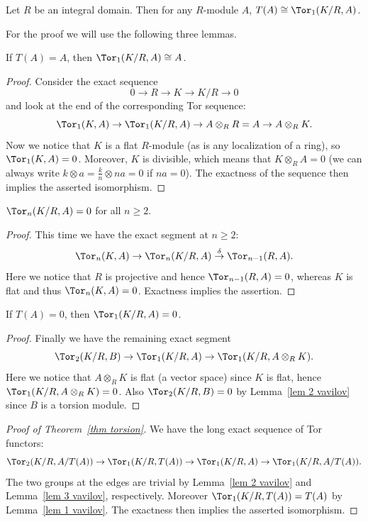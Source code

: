 \begin{thm}\label{thm torsion}
    Let $R$ be an integral domain. Then for any $R$-module $A$, $T(A)\cong \Tor_1(K\slash R,A)$.
\end{thm}
For the proof we will use the following three lemmas.
\begin{lem}\label{lem 1 vavilov}
    If $T(A)=A$, then $\Tor_1(K\slash R,A)\cong A$.
\end{lem}
\begin{proof}
    Consider the exact sequence
    \[0\to  R\to K\to K\slash R\to 0\]
    and look at the end of the corresponding Tor sequence:
    \[\Tor_1(K,A)\to \Tor_1(K\slash R,A)\to A\otimes_R R=A\to A\otimes_R K.\]
    Now we notice that $K$ is a flat $R$-module (as is any localization of a ring), so $\Tor_1(K,A)=0$. Moreover, $K$ is divisible, which means that $K\otimes_R A=0$ (we can always write $k\otimes a=\frac kn\otimes na=0$ if $na=0$). The exactness of the sequence then implies the asserted isomorphism.
\end{proof}

\begin{lem}\label{lem 2 vavilov}
    $\Tor_n(K\slash R,A)=0$ for all $n\geq 2$.
\end{lem}
\begin{proof}
    This time we have the exact segment at $n\geq 2$:
    \[\Tor_n(K,A)\to \Tor_n(K\slash R,A)\overset{\delta}{\to}\Tor_{n-1}(R,A).\]
    Here we notice that $R$ is projective and hence $\Tor_{n-1}(R,A)=0$, whereas $K$ is flat and thus $\Tor_n(K,A)=0$. Exactness implies the assertion.
\end{proof}

\begin{lem}\label{lem 3 vavilov}
    If $T(A)=0$, then $\Tor_1(K\slash R,A)=0$.
\end{lem}
\begin{proof}
    Finally we have the remaining exact segment
    \[\Tor_2(K\slash R,B)\to\Tor_1(K\slash R,A)\to \Tor_1(K\slash R,A\otimes_R K).\]
    Here we notice that $A\otimes_R K$ is flat (a vector space) since $K$ is flat, hence $\Tor_1(K\slash R,A\otimes_R K)=0$. Also $\Tor_2(K\slash R,B)=0$ by Lemma~\ref{lem 2 vavilov} since $B$ is a torsion module.
\end{proof}

\begin{proof}[Proof of Theorem~\ref{thm torsion}]
    We have the long exact sequence of Tor functors:
    \[\Tor_2(K\slash R,A\slash T(A))\to \Tor_1(K\slash R,T(A))\to \Tor_1(K\slash R,A)\to \Tor_1(K\slash R,A\slash T(A)).\]
    The two groups at the edges are trivial by Lemma~\ref{lem 2 vavilov} and Lemma~\ref{lem 3 vavilov}, respectively. Moreover $\Tor_1(K\slash R,T(A))=T(A)$ by Lemma~\ref{lem 1 vavilov}. The exactness then implies the asserted isomorphism.
\end{proof}

